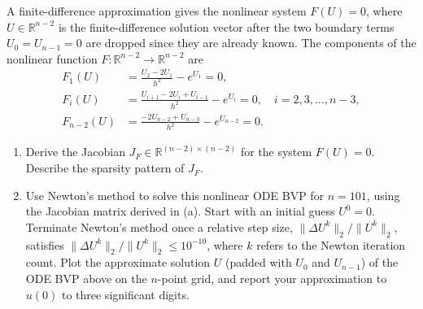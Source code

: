 \documentclass[11pt]{article}
\newcommand{\R}{\mathbb{R}}
\begin{document}
\begin{enumerate}
    A finite-difference approximation gives the nonlinear system $F(U) = 0$,
    where $U \in \R^{n-2}$ is the finite-difference solution vector
    after the two boundary terms $U_0=U_{n-1}=0$ are dropped since they are already
    known. The components of the nonlinear function $F : \R^{n-2} \to
    \R^{n-2}$ are
    \begin{align}
      F_1(U) &= \frac{U_2 - 2U_1}{h^2} - e^{U_1} = 0,\\
      F_i(U) &= \frac{U_{i+1} - 2U_i + U_{i-1}}{h^2} - e^{U_i} = 0, \quad i=2,3,\ldots,n-3,\\
      F_{n-2}(U) &= \frac{- 2U_{n-2} + U_{n-3}}{h^2} - e^{U_{n-2}} = 0.
    \end{align}
    \begin{enumerate}
      \item Derive the Jacobian $J_F \in \R^{(n-2)\times(n-2)}$ for the
	system $F(U) = 0$. Describe the sparsity pattern of $J_F$.
      \item Use Newton's method to solve this nonlinear ODE BVP for $n=101$,
	using the Jacobian matrix derived in (a). Start with an initial guess
	$U^0=0$. Terminate Newton's method once a relative step size, $\|\Delta
	U^k\|_2/\|U^k\|_2$, satisfies $\|\Delta U^k\|_2/\|U^k\|_2 \leq
	10^{-10}$, where $k$ refers to the Newton iteration count. Plot the
	approximate solution $U$ (padded with $U_0$ and $U_{n-1}$) of the ODE
	BVP above on the $n$-point grid, and report your approximation to
	$u(0)$ to three significant digits.
    \end{enumerate}
\end{enumerate}
\end{document}
